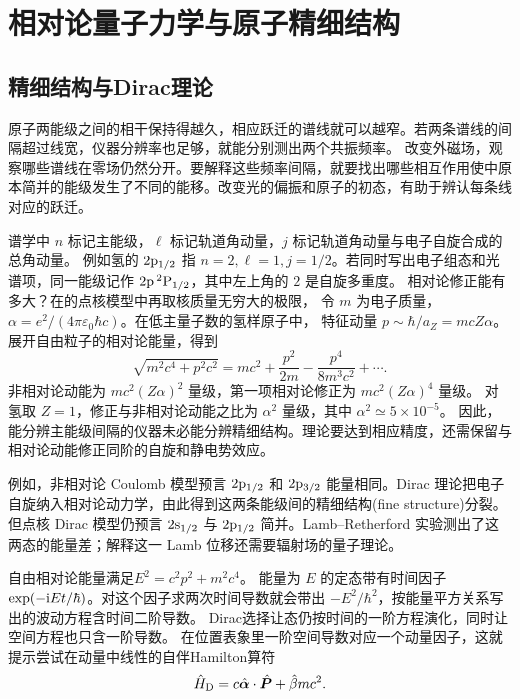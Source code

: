 \chapter{相对论量子力学与原子精细结构}
\label{ch:relativity}

\section{精细结构与Dirac理论}
原子两能级之间的相干保持得越久，相应跃迁的谱线就可以越窄。若两条谱线的间隔超过线宽，仪器分辨率也足够，就能分别测出两个共振频率。
改变外磁场，观察哪些谱线在零场仍然分开。要解释这些频率间隔，就要找出哪些相互作用使中原本简并的能级发生了不同的能移。改变光的偏振和原子的初态，有助于辨认每条线对应的跃迁。

谱学中 $n$ 标记主能级，$\ell$ 标记轨道角动量，$j$ 标记轨道角动量与电子自旋合成的总角动量。
例如氢的 $2\mathrm{p}_{1/2}$ 指 $n = 2,\ell = 1,j = 1/2$。若同时写出电子组态和光谱项，同一能级记作
$2\mathrm{p}\,{}^2\mathrm{P}_{1/2}$，其中左上角的 $2$ 是自旋多重度。
相对论修正能有多大？在的点核模型中再取核质量无穷大的极限，
令 $m$ 为电子质量，$\alpha = e^2/(4\pi\varepsilon_0\hbar c)$。在低主量子数的氢样原子中，
特征动量 $p \sim \hbar/a_Z = mcZ\alpha$。展开自由粒子的相对论能量，得到
\begin{equation}
    \sqrt{m^2c^4 + p^2c^2}
    = mc^2 + \frac{p^2}{2m} - \frac{p^4}{8m^3c^2} + \cdots .
\end{equation}
非相对论动能为 $mc^2(Z\alpha)^2$ 量级，第一项相对论修正为 $mc^2(Z\alpha)^4$ 量级。
对氢取 $Z = 1$，修正与非相对论动能之比为 $\alpha^2$ 量级，其中 $\alpha^2 \simeq 5 \times 10^{-5}$。
因此，能分辨主能级间隔的仪器未必能分辨精细结构。理论要达到相应精度，还需保留与相对论动能修正同阶的自旋和静电势效应。

例如，非相对论 Coulomb 模型预言 $2\mathrm{p}_{1/2}$ 和 $2\mathrm{p}_{3/2}$ 能量相同。Dirac 理论把电子自旋纳入相对论动力学，由此得到这两条能级间的精细结构(fine structure)分裂。
但点核 Dirac 模型仍预言 $2\mathrm{s}_{1/2}$ 与 $2\mathrm{p}_{1/2}$ 简并。Lamb--Retherford 实验测出了这两态的能量差\cite{lamb}；解释这一 Lamb 位移还需要辐射场的量子理论。

自由相对论能量满足$E^2 = c^2p^2 + m^2c^4$。
能量为 $E$ 的定态带有时间因子 $\exp(-\mathrm{i} Et/\hbar)$。对这个因子求两次时间导数就会带出 $-E^2/\hbar^2$，按能量平方关系写出的波动方程含时间二阶导数。
Dirac选择让态仍按时间的一阶方程演化，同时让空间方程也只含一阶导数。
在位置表象里一阶空间导数对应一个动量因子，这就提示尝试在动量中线性的自伴Hamilton算符
\begin{equation}
    \hat{H}_{\mathrm{D}} = c\hat{\bm{\alpha}} \cdot \hat{\bm{P}} + \hat{\beta} mc^2.
\end{equation}

